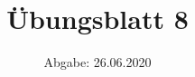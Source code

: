 

\subject{Computational Physics}
\title{Übungsblatt 8}
\date{%
  Abgabe: 26.06.2020
}



\maketitle
\thispagestyle{empty}
\newpage






